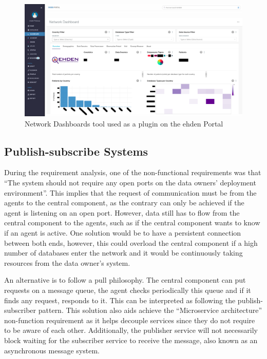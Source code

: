 \begin{figure}
    \center
    \includegraphics[width=\textwidth]{dashboards}
    \caption{Network Dashboards tool used as a plugin on the \gls{ehden} Portal}
    \label{fig:dashboards}
\end{figure}

\subsection{Publish-subscribe Systems}

During the requirement analysis, one of the non-functional requirements was that ``The system should not require any open ports on the data owners’ deployment environment''.
This implies that the request of communication must be from the agents to the central component, as the contrary can only be achieved if the agent is listening on an open port.
However, data still has to flow from the central component to the agents, such as if the central component wants to know if an agent is active.
One solution would be to have a persistent connection between both ends, however, this could overload the central component if a high number of databases enter the network and it would be continuously taking resources from the data owner's system.

An alternative is to follow a pull philosophy.
The central component can put requests on a message queue, the agent checks periodically this queue and if it finds any request, responds to it.
This can be interpreted as following the publish-subscriber pattern.
This solution also aids achieve the ``Microservice architecture'' non-function requirement as it helps decouple services since they do not require to be aware of each other.
Additionally, the publisher service will not necessarily block waiting for the subscriber service to receive the message, also known as an asynchronous message system.

